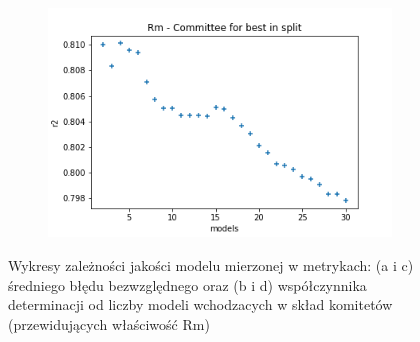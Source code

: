 \begin{figure}
\begin{subfigure}[b]{0.49\textwidth}
         \caption{}
         \label{fig:ea-split-mae-rm}
     \end{subfigure}
     \begin{subfigure}[b]{0.49\textwidth}
         \centering
         \includegraphics[width=\textwidth]{images/Rm_split_r2.png}
         \caption{}
         \label{fig:ea-split-r2-rm}
     \end{subfigure}
        \caption{Wykresy zależności jakości modelu mierzonej w metrykach: (a i c) średniego błędu bezwzględnego oraz (b i d) współczynnika determinacji od liczby modeli wchodzacych w skład komitetów (przewidujących właściwość Rm)}
        \label{fig:rm-committee}
\end{figure}

